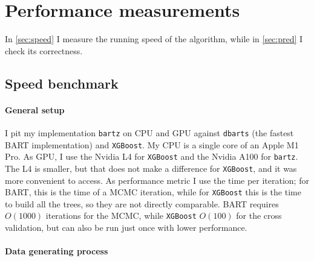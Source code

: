 \documentclass{article}
\let\oldmarginpar\marginpar
\renewcommand{\marginpar}[1]{\oldmarginpar{\sffamily\scriptsize #1}}
\begin{document}
    \section{Performance measurements}
    \label{sec:perf}

    In \autoref{sec:speed} I measure the running speed of the algorithm, while in \autoref{sec:pred} I check its correctness.

    \subsection{Speed benchmark}
    \label{sec:speed}

    \paragraph{General setup}

    I pit my implementation \texttt{bartz} on CPU and GPU against \texttt{dbarts} (the fastest BART implementation) and \texttt{XGBoost}.\marginpar{Add XBART} My CPU is a single core of an Apple M1 Pro. As GPU, I use the Nvidia L4 for \texttt{XGBoost} and the Nvidia A100 for \texttt{bartz}. The L4 is smaller, but that does not make a difference for \texttt{XGBoost}, and it was more convenient to access. As performance metric I use the time per iteration; for BART, this is the time of a MCMC iteration, while for \texttt{XGBoost} this is the time to build all the trees, so they are not directly comparable. BART requires $O(1000)$ iterations for the MCMC, while \texttt{XGBoost} $O(100)$ for the cross validation, but can also be run just once with lower performance.

    \paragraph{Data generating process}
\end{document}
